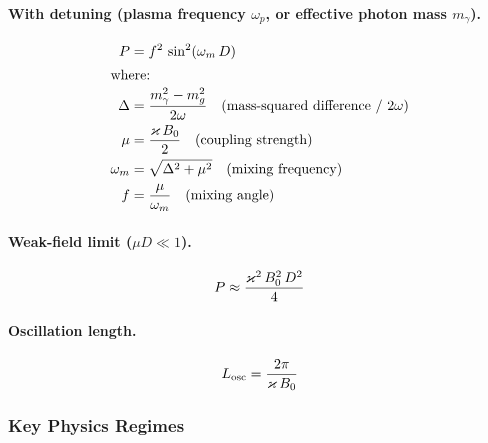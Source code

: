 \paragraph{With detuning (plasma frequency $\omega_p$, or effective photon mass $m_\gamma$).}
\label{par:detuned-conversion}

\begin{align}
  P &= f^2\, \sin^2(\omega_m\, D) \label{eq:gert-P-detuned} \\
  \intertext{where:}
  \Delta &= \frac{m_\gamma^2 - m_g^2}{2\omega} \quad\text{(mass-squared difference / $2\omega$)} \nonumber \\
  \mu &= \frac{\varkappa\,B_0}{2} \quad\text{(coupling strength)} \nonumber \\
  \omega_m &= \sqrt{\Delta^2 + \mu^2} \quad\text{(mixing frequency)} \nonumber \\
  f &= \frac{\mu}{\omega_m} \quad\text{(mixing angle)} \nonumber
\end{align}

\paragraph{Weak-field limit ($\mu D \ll 1$).}
\label{par:weak-field}

\begin{equation}
  P \approx \frac{\varkappa^2\, B_0^2\, D^2}{4}
  \label{eq:gert-P-weak}
\end{equation}

\paragraph{Oscillation length.}
\label{par:osc-length}

\begin{equation}
  L_\mathrm{osc} = \frac{2\pi}{\varkappa\,B_0}
  \label{eq:gert-Losc}
\end{equation}

\subsubsection{Key Physics Regimes}
\label{subsec:physics-regimes}

